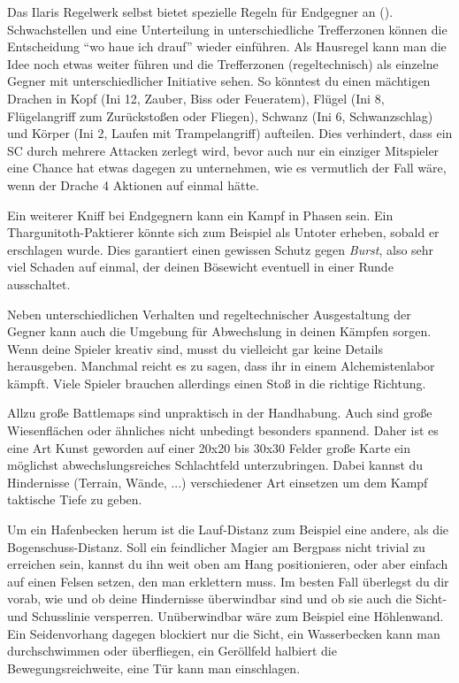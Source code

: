 Das Ilaris Regelwerk selbst bietet spezielle Regeln für Endgegner an (). Schwachstellen und eine Unterteilung in unterschiedliche Trefferzonen können die Entscheidung \enquote{wo haue ich drauf} wieder einführen.
Als Hausregel kann man die Idee noch etwas weiter führen und die Trefferzonen (regeltechnisch) als einzelne Gegner mit unterschiedlicher Initiative sehen.
So könntest du einen mächtigen Drachen in Kopf (Ini 12, Zauber, Biss oder Feueratem), Flügel (Ini 8, Flügelangriff zum Zurückstoßen oder Fliegen), Schwanz (Ini 6, Schwanzschlag) und Körper (Ini 2, Laufen mit Trampelangriff) aufteilen.
Dies verhindert, dass ein SC durch mehrere Attacken zerlegt wird, bevor auch nur ein einziger Mitspieler eine Chance hat etwas dagegen zu unternehmen, wie es vermutlich der Fall wäre, wenn der Drache 4 Aktionen auf einmal hätte.



Ein weiterer Kniff bei Endgegnern kann ein Kampf in Phasen sein.
Ein Thargunitoth-Paktierer könnte sich zum Beispiel als Untoter erheben, sobald er erschlagen wurde.
Dies garantiert einen gewissen Schutz gegen \textit{Burst}, also sehr viel Schaden auf einmal, der deinen Bösewicht eventuell in einer Runde ausschaltet.


Neben unterschiedlichen Verhalten und regeltechnischer Ausgestaltung der Gegner kann auch die Umgebung für Abwechslung in deinen Kämpfen sorgen.
Wenn deine Spieler kreativ sind, musst du vielleicht gar keine Details herausgeben.
Manchmal reicht es zu sagen, dass ihr in einem Alchemistenlabor kämpft.
Viele Spieler brauchen allerdings einen Stoß in die richtige Richtung. 

Allzu große Battlemaps sind unpraktisch in der Handhabung.
Auch sind große Wiesenflächen oder ähnliches nicht unbedingt besonders spannend.
Daher ist es eine Art Kunst geworden auf einer 20x20 bis 30x30 Felder große Karte ein möglichst abwechslungsreiches Schlachtfeld unterzubringen. Dabei kannst du Hindernisse (Terrain, Wände, ...) verschiedener Art einsetzen um dem Kampf taktische Tiefe zu geben. 

Um ein Hafenbecken herum ist die Lauf-Distanz zum Beispiel eine andere, als die Bogenschuss-Distanz.
Soll ein feindlicher Magier am Bergpass nicht trivial zu erreichen sein, kannst du ihn weit oben am Hang positionieren, oder aber einfach auf einen Felsen setzen, den man erklettern muss.
Im besten Fall überlegst du dir vorab, wie und ob deine Hindernisse überwindbar sind und ob sie auch die Sicht- und Schusslinie versperren.
Unüberwindbar wäre zum Beispiel eine Höhlenwand. Ein Seidenvorhang dagegen blockiert nur die Sicht, ein Wasserbecken kann man durchschwimmen oder überfliegen, ein Geröllfeld halbiert die Bewegungsreichweite, eine Tür kann man einschlagen.

